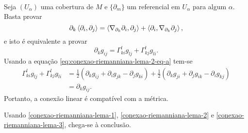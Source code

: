 \begin{demonstracao}
	Seja
	$(U_{\alpha})$ uma cobertura de $M$ e 
	$\{ \partial_m \}$ um referencial em $U_{\alpha}$ para algum $\alpha$.
	Basta provar
	\begin{equation*}
		\partial_k \left\langle \partial_i,\partial_j \right\rangle = \left\langle \nabla_{\partial_k} \partial_i,\partial_j \right\rangle + \left\langle \partial_i,\nabla_{\partial_k} \partial_j \right\rangle,
	\end{equation*}
	e isto é equivalente a provar
	\begin{equation*}
		\partial_k g_{ij} = \Gamma_{ki}^l g_{lj} + \Gamma_{kj}^l g_{li}.
	\end{equation*}
	Usando a equação \eqref{eq:conexao-riemanniana-lema-2-eq-a} tem-se
	\begin{align*}
	\Gamma_{ki}^l g_{lj} + \Gamma_{kj}^l g_{li} &= \frac{1}{2} (\partial_k g_{ij} + \partial_i g_{jk} - \partial_j g_{ki}) + \frac{1}{2} (\partial_k g_{ji} + \partial_j g_{ik} - \partial_i g_{kj})\\
	&= \partial_k g_{ij}.
	\end{align*}
	Portanto, a conexão linear é compatível com a métrica.
\end{demonstracao}

\begin{demonstracao}
	Usando \ref{conexao-riemanniana-lema-1}, \ref{conexao-riemanniana-lema-2} e \ref{conexao-riemanniana-lema-3}, chega-se à conclusão.
\end{demonstracao}


